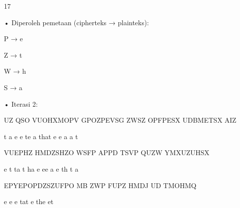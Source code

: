 \documentclass{article}
\begin{document}

17

• Diperoleh pemetaan (cipherteks → plainteks):


P → e


Z → t


W → h


S → a 

• Iterasi 2:

 UZ QSO VUOHXMOPV GPOZPEVSG ZWSZ OPFPESX UDBMETSX AIZ

  t  a         e   e te  a  that  e e a        a    t

 VUEPHZ HMDZSHZO WSFP APPD TSVP QUZW YMXUZUHSX

    e t    ta t  ha e  ee   a e   th     t  a


 EPYEPOPDZSZUFPO MB ZWP FUPZ HMDJ UD TMOHMQ

   e  e e tat  e     the   et
\end{document}
